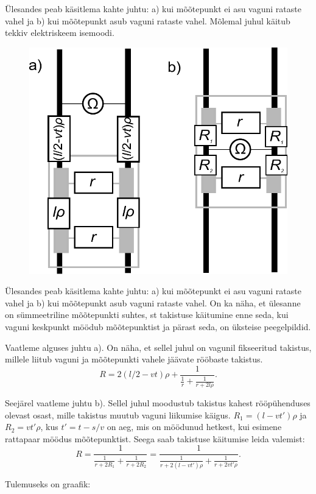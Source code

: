 {\ifHint
Ülesandes peab käsitlema kahte juhtu: a) kui mõõtepunkt ei asu vaguni rataste vahel ja b) kui mõõtepunkt asub vaguni rataste vahel. Mõlemal juhul käitub tekkiv elektriskeem isemoodi.
\fi


\ifSolution
\begin{figure}
\includegraphics[width=\linewidth]{2012-v2g-08-rong_lahendus}
\end{figure}
Ülesandes peab käsitlema kahte juhtu: a) kui mõõtepunkt ei asu vaguni rataste vahel ja b) kui mõõtepunkt asub vaguni rataste vahel. On ka näha, et ülesanne on sümmeetriline mõõtepunkti suhtes, st takistuse käitumine enne seda, kui vaguni keskpunkt möödub mõõtepunktist ja pärast seda, on üksteise peegelpildid.

Vaatleme alguses juhtu a). On näha, et sellel juhul on vagunil fikseeritud takistus, millele liitub vaguni ja mõõtepunkti vahele jäävate rööbaste takistus.
\[
R=2(l/2-vt)\rho+\frac{1}{\frac{1}{r}+\frac{1}{r+2l\rho}}.
\]

Seejärel vaatleme juhtu b). Sellel juhul moodustub takistus kahest rööpühenduses olevast osast, mille takistus muutub vaguni liikumise käigus. $R_1=(l-vt')\rho$ ja $R_2=vt'\rho$, kus $t'=t-s/v$ on aeg, mis on möödunud hetkest, kui esimene rattapaar möödus mõõtepunktist. Seega saab takistuse käitumise leida valemist:
\[
R=\frac{1}{\frac{1}{r+2R_1}+\frac{1}{r+2R_2}}=\frac{1}{\frac{1}{r+2(l-vt')\rho}+\frac{1}{r+2vt'\rho}}.
\]

Tulemuseks on graafik:

}
